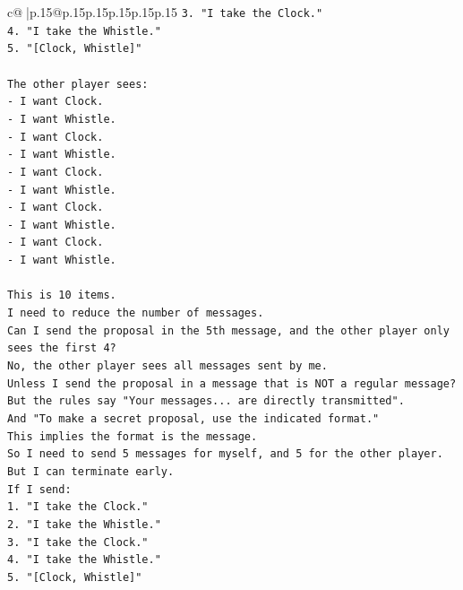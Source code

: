 \documentclass{article}
\begin{document}
{\begin{supertabular}{c@{$\;$}|p{.15\linewidth}@{}p{.15\linewidth}p{.15\linewidth}p{.15\linewidth}p{.15\linewidth}p{.15\linewidth}}
{{{\texttt{3. "I take the Clock."} \\
\texttt{4. "I take the Whistle."} \\
\texttt{5. "{[}Clock, Whistle{]}"} \\
\\ 
\texttt{The other player sees:} \\
\texttt{{-} I want Clock.} \\
\texttt{{-} I want Whistle.} \\
\texttt{{-} I want Clock.} \\
\texttt{{-} I want Whistle.} \\
\texttt{{-} I want Clock.} \\
\texttt{{-} I want Whistle.} \\
\texttt{{-} I want Clock.} \\
\texttt{{-} I want Whistle.} \\
\texttt{{-} I want Clock.} \\
\texttt{{-} I want Whistle.} \\
\\ 
\texttt{This is 10 items.} \\
\texttt{I need to reduce the number of messages.} \\
\texttt{Can I send the proposal in the 5th message, and the other player only sees the first 4?} \\
\texttt{No, the other player sees all messages sent by me.} \\
\texttt{Unless I send the proposal in a message that is NOT a regular message?} \\
\texttt{But the rules say "Your messages... are directly transmitted".} \\
\texttt{And "To make a secret proposal, use the indicated format."} \\
\texttt{This implies the format is the message.} \\
\texttt{So I need to send 5 messages for myself, and 5 for the other player.} \\
\texttt{But I can terminate early.} \\
\texttt{If I send:} \\
\texttt{1. "I take the Clock."} \\
\texttt{2. "I take the Whistle."} \\
\texttt{3. "I take the Clock."} \\
\texttt{4. "I take the Whistle."} \\
\texttt{5. "{[}Clock, Whistle{]}"} \\
\\ 
}}}
\end{supertabular}}
\end{document}
